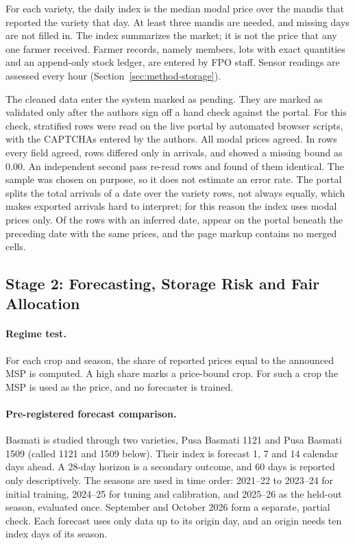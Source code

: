 For each variety, the daily index is the median modal price over the mandis that reported the variety that day. At least three mandis
are needed, and missing days are not filled in. The index summarizes the market; it is not the price that any one farmer received.
Farmer records, namely members, lots with exact quantities and an append-only stock ledger, are entered by FPO staff. Sensor readings
are assessed every hour (Section~\ref{sec:method-storage}).

The cleaned data enter the system marked as pending. They are marked as validated only after the authors sign off a hand check against
the portal. For this check,  stratified rows were read on the live portal by automated browser scripts, with the
CAPTCHAs entered by the authors. All  modal prices agreed. In  rows every field agreed, 
rows differed only in arrivals, and  showed a missing bound as 0.00. An independent second pass re-read
 rows and found  of them identical. The sample was chosen on purpose, so it does not estimate an error rate.
The portal splits the total arrivals of a date over the variety rows, not always equally, which makes exported arrivals hard to
interpret; for this reason the index uses modal prices only. Of the  rows with an inferred date, 
appear on the portal beneath the preceding date with the same prices, and the page markup contains no merged cells.

\subsection{Stage 2: Forecasting, Storage Risk and Fair Allocation}
\label{sec:method-forecast}

\paragraph{Regime test.} For each crop and season, the share of reported prices equal to the announced MSP is computed. A high share
marks a price-bound crop. For such a crop the MSP is used as the price, and no forecaster is trained.

\paragraph{Pre-registered forecast comparison.} Basmati is studied through two varieties, Pusa Basmati 1121 and Pusa Basmati 1509
(called 1121 and 1509 below). Their index is forecast 1, 7 and 14 calendar days ahead. A 28-day horizon is a secondary outcome, and
60 days is reported only descriptively. The seasons are used in time order: 2021--22 to 2023--24 for initial training, 2024--25 for
tuning and calibration, and 2025--26 as the held-out season, evaluated once. September and October 2026 form a separate, partial check.
Each forecast uses only data up to its origin day, and an origin needs ten index days of its season.

